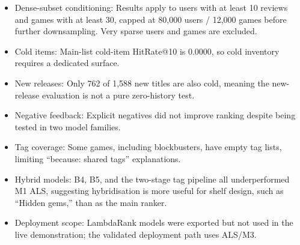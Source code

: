 \documentclass[conference]{IEEEtran}
\begin{document}
\begin{itemize}

\item Dense-subset conditioning: Results apply to users with at least 10 reviews and games with at least 30, capped at 80,000 users / 12,000 games before further downsampling. Very sparse users and games are excluded.

\end{itemize}

\begin{itemize}

\item Cold items: Main-list cold-item HitRate@10 is 0.0000, so cold inventory requires a dedicated surface.

\end{itemize}

\begin{itemize}

\item New releases: Only 762 of 1,588 new titles are also cold, meaning the new-release evaluation is not a pure zero-history test.

\end{itemize}

\begin{itemize}

\item Negative feedback: Explicit negatives did not improve ranking despite being tested in two model families.

\end{itemize}

\begin{itemize}

\item Tag coverage: Some games, including blockbusters, have empty tag lists, limiting ``because: shared tags'' explanations.

\end{itemize}

\begin{itemize}

\item Hybrid models: B4, B5, and the two-stage tag pipeline all underperformed M1 ALS, suggesting hybridisation is more useful for shelf design, such as ``Hidden gems,'' than as the main ranker.

\end{itemize}

\begin{itemize}

\item Deployment scope: LambdaRank models were exported but not used in the live demonstration; the validated deployment path uses ALS/M3.

\end{itemize}
\end{document}
